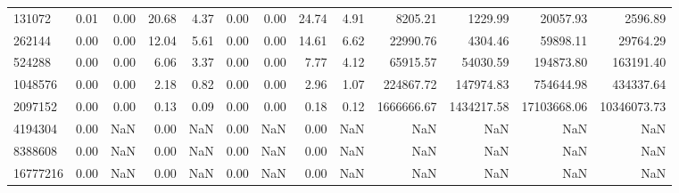 \begin{tabular}{lrrrrrrrrrrrr}
131072 & 0.01 & 0.00 & 20.68 & 4.37 & 0.00 & 0.00 & 24.74 & 4.91 & 8205.21 & 1229.99 & 20057.93 & 2596.89 \\
262144 & 0.00 & 0.00 & 12.04 & 5.61 & 0.00 & 0.00 & 14.61 & 6.62 & 22990.76 & 4304.46 & 59898.11 & 29764.29 \\
524288 & 0.00 & 0.00 & 6.06 & 3.37 & 0.00 & 0.00 & 7.77 & 4.12 & 65915.57 & 54030.59 & 194873.80 & 163191.40 \\
1048576 & 0.00 & 0.00 & 2.18 & 0.82 & 0.00 & 0.00 & 2.96 & 1.07 & 224867.72 & 147974.83 & 754644.98 & 434337.64 \\
2097152 & 0.00 & 0.00 & 0.13 & 0.09 & 0.00 & 0.00 & 0.18 & 0.12 & 1666666.67 & 1434217.58 & 17103668.06 & 10346073.73 \\
4194304 & 0.00 & NaN & 0.00 & NaN & 0.00 & NaN & 0.00 & NaN & NaN & NaN & NaN & NaN \\
8388608 & 0.00 & NaN & 0.00 & NaN & 0.00 & NaN & 0.00 & NaN & NaN & NaN & NaN & NaN \\
16777216 & 0.00 & NaN & 0.00 & NaN & 0.00 & NaN & 0.00 & NaN & NaN & NaN & NaN & NaN \\
\bottomrule
\end{tabular}
